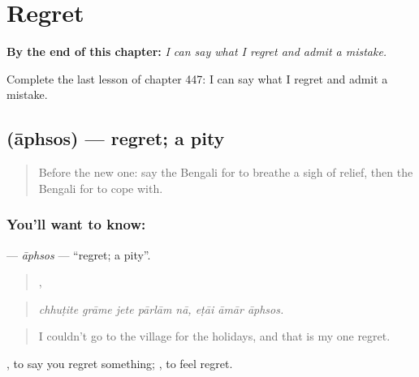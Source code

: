 
\chapter{Regret}
\label{ch:bn-regret}

\begin{chapteropening}
\textbf{By the end of this chapter:} \emph{I can say what I regret and admit a mistake.}

Complete the last lesson of chapter 447: I can say what I regret and admit a mistake.
\end{chapteropening}

\section[\texorpdfstring{\bn{আফসোস} (āphsos)}{আফসোস (āphsos)}]{ (āphsos) — regret; a pity}

\label{lesson:BN-C447-aphsos}



\begin{quote}
Before the new one: say the Bengali for to breathe a sigh of relief, then the Bengali for to cope with.
\end{quote}

\subsection*{You'll want to know: }
\textbf{} — \emph{āphsos} — \textquotedblleft{}regret; a pity\textquotedblright{}.

\begin{quote}
    ,   
\end{quote}

\begin{quote}
\emph{chhuṭite grāme jete pārlām nā, eṭāi āmār āphsos.}
\end{quote}

\begin{quote}
I couldn't go to the village for the holidays, and that is my one regret.
\end{quote}

 , to say you regret something;  , to feel regret.

